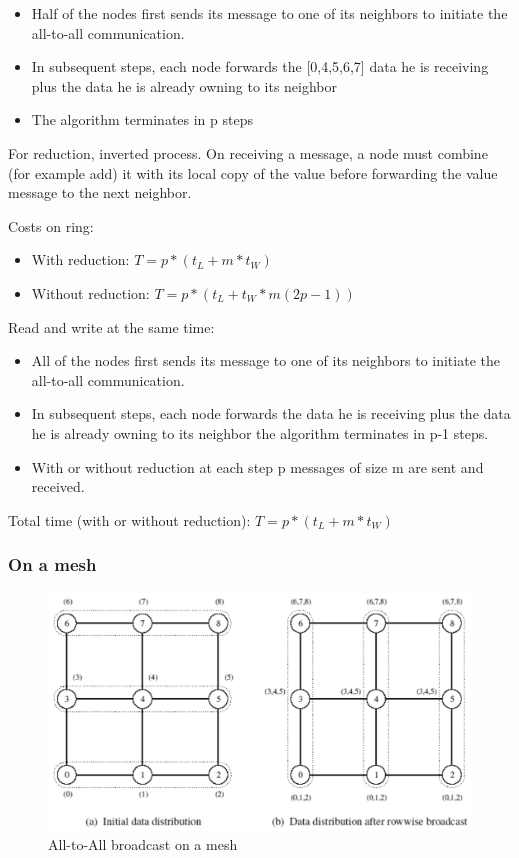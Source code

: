 \documentclass[11pt,a4paper]{report}
\begin{document}
\begin{itemize}
    \item Half of the nodes first sends its message to one of its neighbors to 
    initiate the all-to-all communication.
    
    \item In subsequent steps, each node forwards the [0,4,5,6,7] data he is 
    receiving plus the data he is already owning to its neighbor
    
    \item The algorithm terminates in p steps
\end{itemize}

For reduction, inverted process. On receiving a message, a node must combine  
(for example add) it with its local copy of the value before forwarding the 
value message to the next neighbor.

Costs on ring:

\begin{itemize}
    \item With reduction:
    $T = p*(t_{L} + m*t_{W})$
    
    \item Without reduction:
    $T = p * (t_{L} + t_{W} * m (2p-1))$
\end{itemize}

Read and write at the same time:

\begin{itemize}
    \item All of the nodes first sends its message to one of its neighbors to 
    initiate the all-to-all communication.
    
    \item In subsequent steps, each node forwards the data he is receiving plus 
    the data he is already owning to its neighbor the algorithm terminates in 
    p-1 steps.
    
    \item With or without reduction at each step p messages of size m are sent 
    and received.
\end{itemize}

Total time (with or without reduction): $T = p*(t_{L} + m*t_{W})$

\subsubsection{On a mesh}

\begin{figure}[H]
    \centering
    \includegraphics[width=0.7\linewidth]{img/comm_mesh_al-to-all}
    \caption{All-to-All broadcast on a mesh}
    \label{fig:commmeshal-to-all}
\end{figure}
\end{document}

